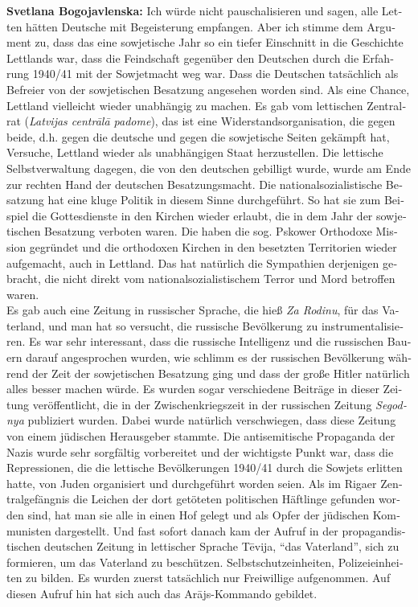 \begin{otherlanguage}{ngerman}
\textbf{Svetlana Bogojavlenska:} Ich würde nicht pauschalisieren und sagen, alle Letten hätten Deutsche mit Begeisterung empfangen. Aber ich stimme dem Argument zu, dass das eine sowjetische Jahr so ein tiefer Einschnitt in die Geschichte Lettlands war, dass die Feindschaft gegenüber den Deutschen durch die Erfahrung 1940/41 mit der Sowjetmacht weg war. Dass die Deutschen tatsächlich als Befreier von der sowjetischen Besatzung angesehen worden sind. Als eine Chance, Lettland vielleicht wieder unabhängig zu machen. Es gab vom lettischen Zentralrat (\textit{Latvijas centrālā padome}), das ist eine Widerstandsorganisation, die gegen beide, d.h. gegen die deutsche und gegen die sowjetische Seiten gekämpft hat, Versuche, Lettland wieder als unabhängigen Staat herzustellen. Die lettische Selbstverwaltung dagegen, die von den deutschen gebilligt wurde, wurde am Ende zur rechten Hand der deutschen Besatzungsmacht. Die nationalsozialistische Besatzung hat eine kluge Politik in diesem Sinne durchgeführt. So hat sie zum Beispiel die Gottesdienste in den Kirchen wieder erlaubt, die in dem Jahr der sowjetischen Besatzung verboten waren. Die haben die sog. Pskower Orthodoxe Mission gegründet und die orthodoxen Kirchen in den besetzten Territorien wieder aufgemacht, auch in Lettland. Das hat natürlich die Sympathien derjenigen gebracht, die nicht direkt vom nationalsozialistischem Terror und Mord betroffen waren.\\
Es gab auch eine Zeitung in russischer Sprache, die hieß \textit{Za Rodinu}, für das Vaterland, und man hat so versucht, die russische Bevölkerung zu instrumentalisieren. Es war sehr interessant, dass die russische Intelligenz und die russischen Bauern darauf angesprochen wurden, wie schlimm es der russischen Bevölkerung während der Zeit der sowjetischen Besatzung ging und dass der große Hitler natürlich alles besser machen würde. Es wurden sogar verschiedene Beiträge in dieser Zeitung veröffentlicht, die in der Zwischenkriegszeit in der russischen Zeitung \textit{Segodnya} publiziert wurden. Dabei wurde natürlich verschwiegen, dass diese Zeitung von einem jüdischen Herausgeber stammte. 
Die antisemitische Propaganda der Nazis wurde sehr sorgfältig vorbereitet und der wichtigste Punkt war, dass die Repressionen, die die lettische Bevölkerungen 1940/41 durch die Sowjets erlitten hatte, von Juden organisiert und durchgeführt worden seien. Als im Rigaer Zentralgefängnis die Leichen der dort getöteten politischen Häftlinge gefunden worden sind, hat man sie alle in einen Hof gelegt und als Opfer der jüdischen Kommunisten dargestellt. Und fast sofort danach kam der Aufruf in der propagandistischen deutschen Zeitung in lettischer Sprache Tēvija, “das Vaterland”, sich zu formieren, um das Vaterland zu beschützen. Selbstschutzeinheiten, Polizeieinheiten zu bilden. Es wurden zuerst tatsächlich nur Freiwillige aufgenommen. Auf diesen Aufruf hin hat sich auch das Arājs-Kommando gebildet.


\end{otherlanguage}
